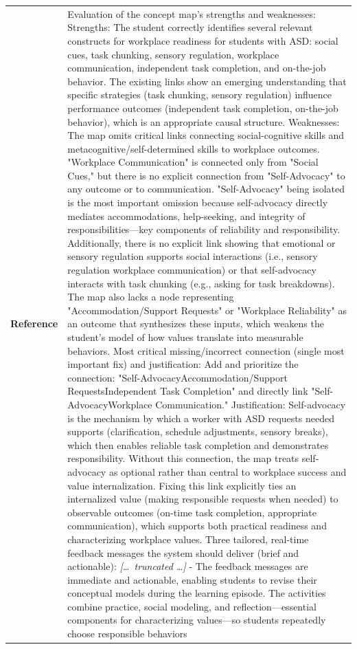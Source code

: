 \begin{longtable}{@{}l p{12.5cm}@{}}
  \textbf{Reference} & Evaluation of the concept map's strengths and weaknesses: \newline Strengths: The student correctly identifies several relevant constructs for workplace readiness for students with ASD: social cues, task chunking, sensory regulation, workplace communication, independent task completion, and on-the-job behavior. The existing links show an emerging understanding that specific strategies (task chunking, sensory regulation) influence performance outcomes (independent task completion, on-the-job behavior), which is an appropriate causal structure. \newline Weaknesses: The map omits critical links connecting social-cognitive skills and metacognitive/self-determined skills to workplace outcomes. "Workplace Communication" is connected only from "Social Cues," but there is no explicit connection from "Self-Advocacy" to any outcome or to communication. "Self-Advocacy" being isolated is the most important omission because self-advocacy directly mediates accommodations, help-seeking, and integrity of responsibilities---key components of reliability and responsibility. Additionally, there is no explicit link showing that emotional or sensory regulation supports social interactions (i.e., sensory regulation workplace communication) or that self-advocacy interacts with task chunking (e.g., asking for task breakdowns). The map also lacks a node representing "Accommodation/Support Requests" or "Workplace Reliability" as an outcome that synthesizes these inputs, which weakens the student's model of how values translate into measurable behaviors. \newline Most critical missing/incorrect connection (single most important fix) and justification: \newline Add and prioritize the connection: "Self-AdvocacyAccommodation/Support RequestsIndependent Task Completion" and directly link "Self-AdvocacyWorkplace Communication." Justification: Self-advocacy is the mechanism by which a worker with ASD requests needed supports (clarification, schedule adjustments, sensory breaks), which then enables reliable task completion and demonstrates responsibility. Without this connection, the map treats self-advocacy as optional rather than central to workplace success and value internalization. Fixing this link explicitly ties an internalized value (making responsible requests when needed) to observable outcomes (on-time task completion, appropriate communication), which supports both practical readiness and characterizing workplace values. \newline Three tailored, real-time feedback messages the system should deliver (brief and actionable): \newline \textit{[\ldots\ truncated \ldots]} \newline - The feedback messages are immediate and actionable, enabling students to revise their conceptual models during the learning episode. The activities combine practice, social modeling, and reflection---essential components for characterizing values---so students repeatedly choose responsible behaviors 
\end{longtable}
